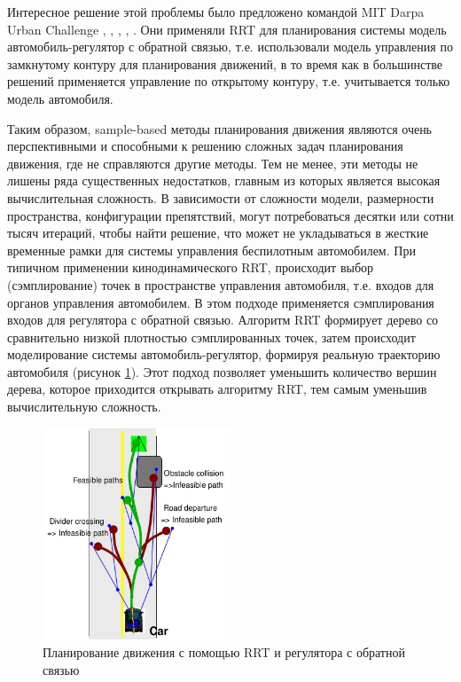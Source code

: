 Интересное решение этой проблемы было предложено командой MIT Darpa Urban Challenge \cite{darpa_mit}, \cite{darpa_mit_2},
\cite{darpa_mit_3}, \cite{darpa_mit_3}, \cite{darpa_mit_4}. Они применяли RRT для планирования
системы модель автомобиль-регулятор с обратной связью, т.е. использовали модель управления по замкнутому контуру для
планирования движений, в то время как в большинстве решений применяется управление по открытому контуру, т.е.
учитывается только модель автомобиля.


Таким образом, sample-based методы планирования движения являются очень перспективными и способными к решению
сложных задач планирования движения, где не справляются другие методы. Тем не менее, эти методы не лишены ряда
существенных недостатков, главным из которых является высокая вычислительная сложность. В зависимости от сложности
модели, размерности пространства, конфигурации препятствий, могут потребоваться десятки или сотни тысяч итераций,
чтобы найти решение, что может не укладываться в жесткие временные рамки для системы управления беспилотным
автомобилем. При типичном применении кинодинамического RRT, происходит выбор (сэмплирование) точек в пространстве
управления автомобиля, т.е. входов для органов управления автомобилем. В этом подходе применяется сэмплирования
входов для регулятора с обратной связью. Алгоритм RRT формирует дерево со сравнительно низкой плотностью сэмплированных
точек, затем происходит моделирование системы автомобиль-регулятор, формируя реальную траекторию автомобиля (рисунок
\ref{img:darpa_mit_rrt}). Этот подход позволяет уменьшить количество вершин дерева, которое приходится открывать
алгоритму RRT, тем самым уменьшив вычислительную сложность.

\begin{figure}[h]
    \centering
    \includegraphics[width=0.5\textwidth]{images/darpa_mit_rrt}
    \caption{Планирование движения с помощью RRT и регулятора с обратной связью}
    \label{img:darpa_mit_rrt}
\end{figure}



